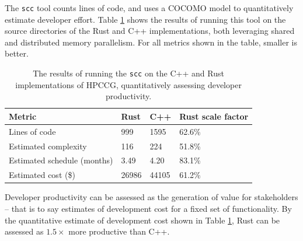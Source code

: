 The \texttt{scc} tool counts lines of code, and uses a COCOMO model to quantitatively estimate developer effort. Table \ref{tab:scc-language-comparison} shows the results of running this tool on the source directories of the Rust and C++ implementations, both leveraging shared and distributed memory parallelism. For all metrics shown in the table, smaller is better.

\begin{table}[H]
    \centering
    \caption{The results of running the \texttt{scc} on the C++ and Rust implementations of HPCCG, quantitatively assessing developer productivity.}
    \label{tab:scc-language-comparison}
    \begin{tabular}{|l||l|l|l|}
    \hline
    \textbf{Metric}             & \textbf{Rust} & \textbf{C++} & \textbf{Rust scale factor} \\ \hline\hline
    Lines of code               & 999           & 1595         & 62.6\%                     \\ \hline
    Estimated complexity        & 116           & 224          & 51.8\%                     \\ \hline
    Estimated schedule (months) & 3.49          & 4.20         & 83.1\%                     \\ \hline
    Estimated cost (\$)         & 26986         & 44105        & 61.2\%                     \\ \hline
    \end{tabular}
\end{table}


Developer productivity can be assessed as the generation of value for stakeholders -- that is to say estimates of development cost for a fixed set of functionality. By the quantitative estimate of development cost shown in Table \ref{tab:scc-language-comparison}, Rust can be assessed as $1.5 \times$ more productive than C++.

